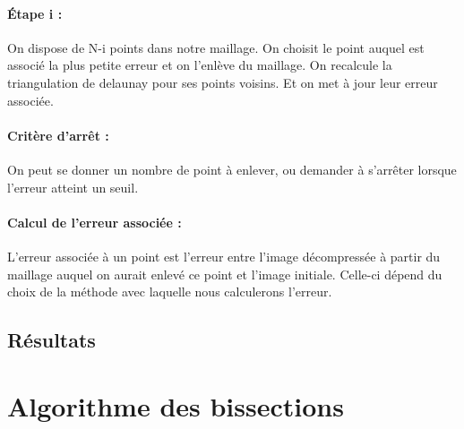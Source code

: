 \documentclass{report}
\begin{document}
\paragraph{Étape i :}

On dispose de N-i points dans notre maillage.
On choisit le point auquel est associé la plus petite erreur et on l'enlève du maillage.
On recalcule la triangulation de delaunay pour ses points voisins.
Et on met à jour leur erreur associée.

\paragraph{Critère d'arrêt :}
On peut se donner un nombre de point à enlever, ou demander à s'arrêter lorsque l'erreur atteint un seuil.

\paragraph{Calcul de l'erreur associée :}
L'erreur associée à un point est l'erreur entre l'image décompressée à partir du maillage auquel on aurait enlevé ce point et l'image initiale. Celle-ci dépend du choix de la méthode avec laquelle nous calculerons l'erreur.

\subsection{Résultats}



\section{Algorithme des bissections}
\end{document}
